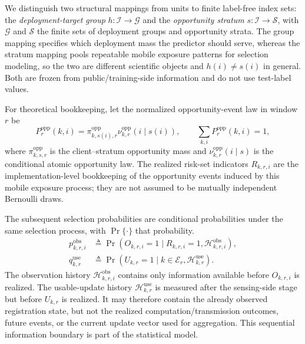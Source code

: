\documentclass[letterpaper,journal]{IEEEtran}
\begin{document}
We distinguish two structural mappings from units to finite label-free index
sets: the \emph{deployment-target group} $h:\mathcal{I}\to\mathcal{G}$ and the
\emph{opportunity stratum} $s:\mathcal{I}\to\mathcal{S}$, with $\mathcal{G}$ and
$\mathcal{S}$ the finite sets of deployment groups and opportunity strata.  The
group mapping specifies which deployment mass the predictor should serve, whereas
the stratum mapping pools repeatable mobile exposure patterns for selection
modeling, so the two are different scientific objects and $h(i)\neq s(i)$ in
general.  Both are frozen from public/training-side information and do not use
test-label values.

For theoretical bookkeeping, let the normalized opportunity-event law in
window $r$ be
\begin{equation}
 P_r^{\mathrm{opp}}(k,i)
 =
 \pi^{\mathrm{opp}}_{k,s(i),r}
 \nu^{\mathrm{opp}}_{k,r}(i\mid s(i)),
 \qquad
 \sum_{k,i}P_r^{\mathrm{opp}}(k,i)=1,
 \label{eq:opp_event_law}
\end{equation}
where $\pi^{\mathrm{opp}}_{k,s,r}$ is the client--stratum opportunity mass and
$\nu^{\mathrm{opp}}_{k,r}(i\mid s)$ is the conditional atomic opportunity law.
The realized risk-set indicators $R_{k,r,i}$ are the implementation-level
bookkeeping of the opportunity events induced by this mobile exposure process;
they are not assumed to be mutually independent Bernoulli draws.

The subsequent selection probabilities are conditional probabilities under the
same selection process, with $\Pr\{\cdot\}$ that probability.
\begin{align}
 p^{\mathrm{obs}}_{k,r,i}
 &\triangleq
 \Pr\!\left(
 O_{k,r,i}=1
 \mid
 R_{k,r,i}=1,\mathcal{H}^{\mathrm{obs}}_{k,r,i}
 \right),
 \label{eq:pobs_def}\\
 q^{\mathrm{use}}_{k,r}
 &\triangleq
 \Pr\!\left(
 U_{k,r}=1
 \mid
 k\in\mathcal{E}_r,\mathcal{H}^{\mathrm{use}}_{k,r}
 \right).
 \label{eq:quse_def}
\end{align}
The observation history $\mathcal{H}^{\mathrm{obs}}_{k,r,i}$ contains
only information available before $O_{k,r,i}$ is realized.  The
usable-update history $\mathcal{H}^{\mathrm{use}}_{k,r}$ is measured
after the sensing-side stage but before $U_{k,r}$ is realized.  It may
therefore contain the already observed registration state, but not the
realized computation/transmission outcomes, future events, or the
current update vector used for aggregation.  This sequential
information boundary is part of the statistical model.
\end{document}
